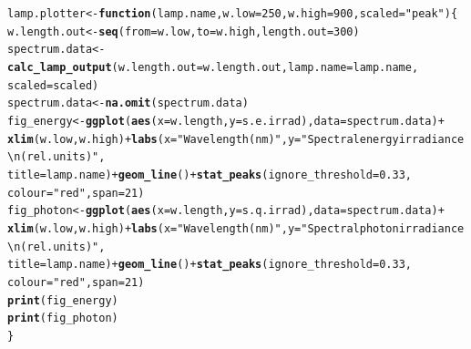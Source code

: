 \documentclass{article}\usepackage[]{graphicx}\usepackage[]{color}
\makeatletter
\newcommand{\hlnum}[1]{\textcolor[rgb]{0.686,0.059,0.569}{#1}}%
\newcommand{\hlstr}[1]{\textcolor[rgb]{0.192,0.494,0.8}{#1}}%
\newcommand{\hlopt}[1]{\textcolor[rgb]{0,0,0}{#1}}%
\newcommand{\hlstd}[1]{\textcolor[rgb]{0.345,0.345,0.345}{#1}}%
\newcommand{\hlkwa}[1]{\textcolor[rgb]{0.161,0.373,0.58}{\textbf{#1}}}%
\newcommand{\hlkwb}[1]{\textcolor[rgb]{0.69,0.353,0.396}{#1}}%
\newcommand{\hlkwc}[1]{\textcolor[rgb]{0.333,0.667,0.333}{#1}}%
\newcommand{\hlkwd}[1]{\textcolor[rgb]{0.737,0.353,0.396}{\textbf{#1}}}%
\newenvironment{kframe}{%
 \def\at@end@of@kframe{}%
 \ifinner\ifhmode%
  \def\at@end@of@kframe{\end{minipage}}%
  \begin{minipage}{\columnwidth}%
 \fi\fi%
 \def\FrameCommand##1{\hskip\@totalleftmargin \hskip-\fboxsep
 \colorbox{shadecolor}{##1}\hskip-\fboxsep
     \hskip-\linewidth \hskip-\@totalleftmargin \hskip\columnwidth}%
 \MakeFramed {\advance\hsize-\width
   \@totalleftmargin\z@ \linewidth\hsize
   \@setminipage}}%
 {\par\unskip\endMakeFramed%
 \at@end@of@kframe}
\newenvironment{knitrout}{}{} %
\makeatother
\begin{document}
\begin{knitrout}\footnotesize
{}\color{fgcolor}\begin{kframe}
\begin{alltt}
\hlstd{lamp.plotter} \hlkwb{<-} \hlkwa{function}\hlstd{(}\hlkwc{lamp.name}\hlstd{,} \hlkwc{w.low} \hlstd{=} \hlnum{250}\hlstd{,} \hlkwc{w.high} \hlstd{=} \hlnum{900}\hlstd{,} \hlkwc{scaled} \hlstd{=} \hlstr{"peak"}\hlstd{) \{}
    \hlstd{w.length.out} \hlkwb{<-} \hlkwd{seq}\hlstd{(}\hlkwc{from} \hlstd{= w.low,} \hlkwc{to} \hlstd{= w.high,} \hlkwc{length.out} \hlstd{=} \hlnum{300}\hlstd{)}
    \hlstd{spectrum.data} \hlkwb{<-} \hlkwd{calc_lamp_output}\hlstd{(}\hlkwc{w.length.out} \hlstd{= w.length.out,} \hlkwc{lamp.name} \hlstd{= lamp.name,}
        \hlkwc{scaled} \hlstd{= scaled)}
    \hlstd{spectrum.data} \hlkwb{<-} \hlkwd{na.omit}\hlstd{(spectrum.data)}
    \hlstd{fig_energy} \hlkwb{<-} \hlkwd{ggplot}\hlstd{(}\hlkwd{aes}\hlstd{(}\hlkwc{x} \hlstd{= w.length,} \hlkwc{y} \hlstd{= s.e.irrad),} \hlkwc{data} \hlstd{= spectrum.data)} \hlopt{+}
        \hlkwd{xlim}\hlstd{(w.low, w.high)} \hlopt{+} \hlkwd{labs}\hlstd{(}\hlkwc{x} \hlstd{=} \hlstr{"Wavelength (nm)"}\hlstd{,} \hlkwc{y} \hlstd{=} \hlstr{"Spectral energy irradiance\textbackslash{}n(rel. units)"}\hlstd{,}
        \hlkwc{title} \hlstd{= lamp.name)} \hlopt{+} \hlkwd{geom_line}\hlstd{()} \hlopt{+} \hlkwd{stat_peaks}\hlstd{(}\hlkwc{ignore_threshold} \hlstd{=} \hlnum{0.33}\hlstd{,}
        \hlkwc{colour} \hlstd{=} \hlstr{"red"}\hlstd{,} \hlkwc{span} \hlstd{=} \hlnum{21}\hlstd{)}
    \hlstd{fig_photon} \hlkwb{<-} \hlkwd{ggplot}\hlstd{(}\hlkwd{aes}\hlstd{(}\hlkwc{x} \hlstd{= w.length,} \hlkwc{y} \hlstd{= s.q.irrad),} \hlkwc{data} \hlstd{= spectrum.data)} \hlopt{+}
        \hlkwd{xlim}\hlstd{(w.low, w.high)} \hlopt{+} \hlkwd{labs}\hlstd{(}\hlkwc{x} \hlstd{=} \hlstr{"Wavelength (nm)"}\hlstd{,} \hlkwc{y} \hlstd{=} \hlstr{"Spectral photon irradiance\textbackslash{}n(rel. units)"}\hlstd{,}
        \hlkwc{title} \hlstd{= lamp.name)} \hlopt{+} \hlkwd{geom_line}\hlstd{()} \hlopt{+} \hlkwd{stat_peaks}\hlstd{(}\hlkwc{ignore_threshold} \hlstd{=} \hlnum{0.33}\hlstd{,}
        \hlkwc{colour} \hlstd{=} \hlstr{"red"}\hlstd{,} \hlkwc{span} \hlstd{=} \hlnum{21}\hlstd{)}
    \hlkwd{print}\hlstd{(fig_energy)}
    \hlkwd{print}\hlstd{(fig_photon)}
\hlstd{\}}
\end{alltt}
\end{kframe}
\end{knitrout}


\newpage
\end{document}
